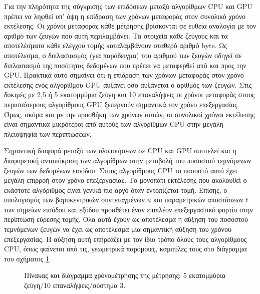 Για την πληρότητα της σύγκρισης των επιδόσεων μεταξύ αλγορίθμων CPU και GPU πρέπει να ληφθεί υπ' όψη η επίδραση των χρόνων μεταφοράς στον συνολικό χρόνο εκτέλεσης. Οι χρόνοι μεταφοράς κάθε μέτρησης βρίσκονται σε ευθεία αναλογία με τον αριθμό των ζευγών που αυτή περιλαμβάνει. Τα στοιχεία κάθε ζεύγους και τα αποτελέσματα κάθε ελέγχου τομής καταλαμβάνουν σταθερό αριθμό byte. Ως αποτέλεσμα, ο διπλασιασμός (για παράδειγμα) του αριθμού των ζευγών οδηγεί σε διπλασιασμό της ποσότητας δεδομένων που πρέπει να μεταφερθεί από και προς την GPU. Πρακτικά αυτό σημαίνει ότι η επίδραση των χρόνων μεταφοράς στον χρόνο εκτέλεσης ενός αλγορίθμου GPU αυξάνει όσο αυξάνεται ο αριθμός των ζευγών. Στις δοκιμές με 2,5 ή 5 εκατομμύρια ζεύγη και 10 επαναλήψεις οι χρόνοι μεταφοράς στους περισσότερους αλγορίθμους GPU ξεπερνούν σημαντικά τον χρόνο επεξεργασίας. Όμως, ακόμα και με την προσθήκη των χρόνων αυτών, οι συνολικοί χρόνοι εκτέλεσης είναι σημαντικά μικρότεροι από αυτούς των αλγορίθμων CPU στην μεγάλη πλειοψηφία των περιπτώσεων.

Σημαντική διαφορά μεταξύ των υλοποιήσεων σε CPU και GPU αποτελεί και η διαφορετική ανταπόκριση των αλγορίθμων στην μεταβολή του ποσοστού τεμνόμενων ζευγών των δεδομένων εισόδου. Στους αλγορίθμους CPU το ποσοστό αυτό έχει μεγάλη επιρροή στον χρόνο επεξεργασίας. Το μονοπάτι εκτέλεσης που ακολουθεί ο εκάστοτε αλγόριθμος είναι γενικά πιο αργό όταν εντοπίζεται τομή. Επίσης, ο υπολογισμός των βαρυκεντρικών συντεταγμένων $u$ και παραμετρικών αποστάσεων $t$ των σημείων εισόδου και εξόδου προσθέτει έναν επιπλέον επεξεργαστικό φορτίο στην περίπτωση εύρεσης τομής. Όλα αυτά έχουν ως αποτέλεσμα η αύξηση του ποσοστού τεμνόμενων ζευγών να έχει ως αποτέλεσμα μία σημαντική αύξηση του χρόνου επεξεργασίας. Η αύξηση αυτή επηρεάζει με τον ίδιο τρόπο όλους τους αλγορίθμους CPU, όπως φαίνεται από τις, γεωμετρικά παρόμοιες, καμπύλες τους στο διάγραμμα του σχήματος \ref{gpuexample}. 

\begin{figure}[h!]
\begin{center}
\tabcolsep=0.11cm
\scalebox{0.6}{}
\scalebox{0.9}{
}\end{center}
\caption{Πίνακας και διάγραμμα χρόνομέτρησης της μέτρησης: 5 εκατομμύρια ζεύγη/10 επαναλήψεις/σύστημα 3.}
\label{gpuexample}
\end{figure}

